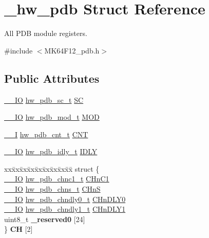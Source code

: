 \hypertarget{struct__hw__pdb}{}\section{\+\_\+hw\+\_\+pdb Struct Reference}
\label{struct__hw__pdb}


All P\+DB module registers.  




{\ttfamily \#include $<$M\+K64\+F12\+\_\+pdb.\+h$>$}

\subsection*{Public Attributes}
\begin{DoxyCompactItemize}
\item 
\hyperlink{core__sc300_8h_aec43007d9998a0a0e01faede4133d6be}{\+\_\+\+\_\+\+IO} \hyperlink{union__hw__pdb__sc}{hw\+\_\+pdb\+\_\+sc\+\_\+t} \hyperlink{struct__hw__pdb_a85e39451c651f57f7228210e6ed72292}{SC}
\item 
\hyperlink{core__sc300_8h_aec43007d9998a0a0e01faede4133d6be}{\+\_\+\+\_\+\+IO} \hyperlink{union__hw__pdb__mod}{hw\+\_\+pdb\+\_\+mod\+\_\+t} \hyperlink{struct__hw__pdb_a8c9f4083784a5a9ecf7afa5d15ec26f5}{M\+OD}
\item 
\hyperlink{core__sc300_8h_af63697ed9952cc71e1225efe205f6cd3}{\+\_\+\+\_\+I} \hyperlink{union__hw__pdb__cnt}{hw\+\_\+pdb\+\_\+cnt\+\_\+t} \hyperlink{struct__hw__pdb_a42c59d9c9753d9af7e9f333ae64e36c5}{C\+NT}
\item 
\hyperlink{core__sc300_8h_aec43007d9998a0a0e01faede4133d6be}{\+\_\+\+\_\+\+IO} \hyperlink{union__hw__pdb__idly}{hw\+\_\+pdb\+\_\+idly\+\_\+t} \hyperlink{struct__hw__pdb_af46f675018d92896d7999c03f2849a9a}{I\+D\+LY}
\item 
\begin{tabbing}
xx\=xx\=xx\=xx\=xx\=xx\=xx\=xx\=xx\=\kill
struct \{\\
\>\hyperlink{core__sc300_8h_aec43007d9998a0a0e01faede4133d6be}{\_\_IO} \hyperlink{union__hw__pdb__chnc1}{hw\_pdb\_chnc1\_t} \hyperlink{struct__hw__pdb_a0b64eff3dac33d1d9e4a4b22d2ab792c}{CHnC1}\\
\>\hyperlink{core__sc300_8h_aec43007d9998a0a0e01faede4133d6be}{\_\_IO} \hyperlink{union__hw__pdb__chns}{hw\_pdb\_chns\_t} \hyperlink{struct__hw__pdb_ab64651cd96a5aaea89f5ff307e0e3f42}{CHnS}\\
\>\hyperlink{core__sc300_8h_aec43007d9998a0a0e01faede4133d6be}{\_\_IO} \hyperlink{union__hw__pdb__chndly0}{hw\_pdb\_chndly0\_t} \hyperlink{struct__hw__pdb_abbe59362e51a6c883afa38ae4066fdde}{CHnDLY0}\\
\>\hyperlink{core__sc300_8h_aec43007d9998a0a0e01faede4133d6be}{\_\_IO} \hyperlink{union__hw__pdb__chndly1}{hw\_pdb\_chndly1\_t} \hyperlink{struct__hw__pdb_a4c64a431a28839a76b5bafd3ef5ce6c8}{CHnDLY1}\\
\>uint8\_t {\bfseries \_reserved0} \mbox{[}24\mbox{]}\\
\} {\bfseries CH} \mbox{[}2\mbox{]}\hypertarget{struct__hw__pdb_af3f3aa92d5964f7babd13e1b4e16940f}{}\label{struct__hw__pdb_af3f3aa92d5964f7babd13e1b4e16940f}
\\


\end{tabbing}
\end{DoxyCompactItemize}
